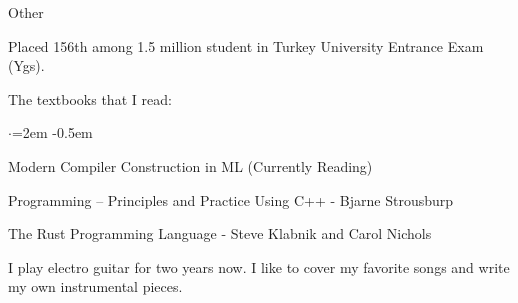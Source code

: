 \documentclass{resume} %
\begin{document}
\begin{rSection}{Other}
    \item Placed 156th among 1.5 million student in Turkey University Entrance Exam (Ygs).
    \item The textbooks that I read:
    \begin{list}{$\cdot$}{\leftmargin=2em}
    \itemsep -0.5em \vspace{-0.5em} %
    \item Modern Compiler Construction in ML (Currently Reading)
    \item Programming – Principles and Practice Using C++ - Bjarne Strousburp
    \item The Rust Programming Language - Steve Klabnik and Carol Nichols
    \end{list}
    \item I play electro guitar for two years now. I like to cover my favorite songs and write my own instrumental pieces.
\end{rSection}





\end{document}
